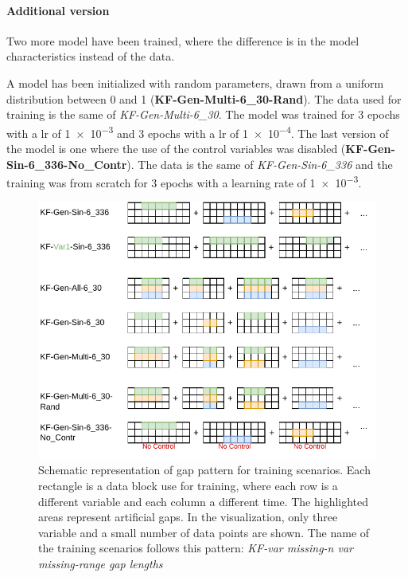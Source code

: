 \documentclass{article}
\begin{document}
\paragraph{Additional version} Two more model have been trained, where the difference is in the model characteristics instead of the data.

A model has been initialized with random parameters, drawn from a uniform distribution between 0 and 1 (\textbf{KF-Gen-Multi-6\_30-Rand}). The data used for training is the same of  \textit{KF-Gen-Multi-6\_30}. The model was trained for 3 epochs with a lr of \num{1e-3} and 3 epochs with a lr of \num{1e-4}. 
The last version of the model is one where the use of the control variables was disabled (\textbf{KF-Gen-Sin-6\_336-No\_Contr}). The data is the same of \textit{KF-Gen-Sin-6\_336} and the training was from scratch for \num{3} epochs with a learning rate of \num{1e-3}.

\begin{figure}
\centerline{\includegraphics[width=\textwidth]{training scenarios}}
\caption{Schematic representation of gap pattern for training scenarios. Each rectangle is a data block use for training, where each row is a different variable and each column a different time. The highlighted areas represent artificial gaps. In the visualization, only three variable and a small number of data points are shown. The name of the training scenarios follows this pattern: \textit{KF-\textlangle var missing\textrangle-\textlangle n var missing\textrangle-\textlangle range gap lengths }}
\label{fig:training}
\end{figure}
\end{document}
